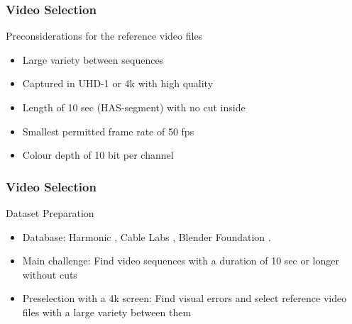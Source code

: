 \begin{frame}
\frametitle{Video Selection}

\large{Preconsiderations for the reference video files}
\begin{itemize}
	
\item Large variety between sequences
\item Captured in UHD-1 or 4k with high quality
\item Length of 10 sec (HAS-segment) with no cut inside
\item Smallest permitted frame rate of 50 fps
\item Colour depth of 10 bit per channel

\end{itemize}

\end{frame}


\begin{frame}
\frametitle{Video Selection}
\large{Dataset Preparation}

\begin{itemize}

\item Database:
\newline Harmonic \cite{web:harmonic}, Cable Labs \cite{web:cablelabs}, Blender Foundation \cite{web:bbb}.	
\item Main challenge: 
\newline Find video sequences with a duration of 10 sec or longer without cuts
\item Preselection with a 4k screen:
\newline Find visual errors and select reference video files with a large variety between them

\end{itemize}
\end{frame}


